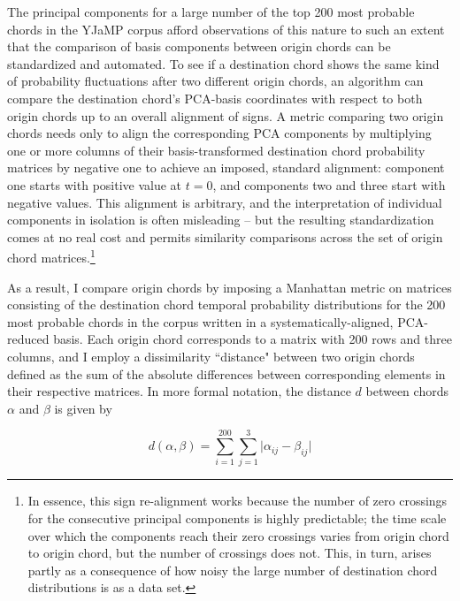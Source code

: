 The principal components for a large number of the top 200 most probable chords in the YJaMP corpus afford observations of this nature to such an extent that the comparison of basis components between origin chords can be standardized and automated.  To see if a destination chord shows the same kind of probability fluctuations after two different origin chords, an algorithm can compare the destination chord's PCA-basis coordinates with respect to both origin chords up to an overall alignment of signs.  A metric comparing two origin chords needs only to align the corresponding PCA components by multiplying one or more columns of their basis-transformed destination chord probability matrices by negative one to achieve an imposed, standard alignment: component one starts with positive value at $t=0$, and components two and three start with negative values.  This alignment is arbitrary, and the interpretation of individual components in isolation is often misleading -- but the resulting standardization comes at no real cost and permits similarity comparisons across the set of origin chord matrices.\footnote{In essence, this sign re-alignment works because the number of zero crossings for the consecutive principal components is highly predictable; the time scale over which the components reach their zero crossings varies from origin chord to origin chord, but the number of crossings does not.  This, in turn, arises partly as a consequence of how noisy the large number of destination chord distributions is as a data set.}

As a result, I compare origin chords by imposing a Manhattan metric on matrices consisting of the destination chord temporal probability distributions for the 200 most probable chords in the corpus written in a systematically-aligned, PCA-reduced basis.  Each origin chord corresponds to a matrix with 200 rows and three columns, and I employ a dissimilarity ``distance" between two origin chords defined as the sum of the absolute differences between corresponding elements in their respective matrices.  In more formal notation, the distance $d$ between chords $\alpha$ and $\beta$ is given by

\begin{equation}
d(\alpha, \beta) = \sum_{i=1}^{200} \sum_{j=1}^3 \lvert \alpha_{ij} - \beta_{ij} \rvert
\end{equation}

